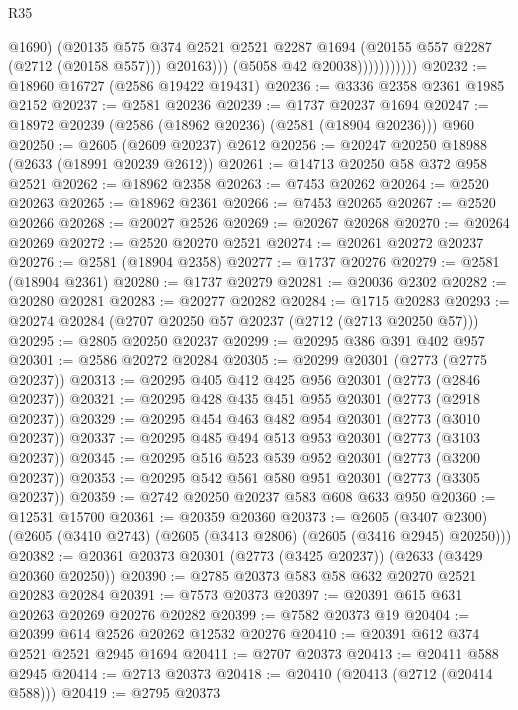 \begin{lexlean}{R35}
\begin{coremodule}
                              @1690)
                            (@20135
                              @575
                              @374
                              @2521
                              @2521
                              @2287
                              @1694
                              (@20155 @557 @2287 (@2712 (@20158 @557)))
                              @20163)))
                        (@5058 @42 @20038)))))))))))
@20232 := @18960 @16727 (@2586 @19422 @19431)
@20236 := @3336 @2358 @2361 @1985 @2152
@20237 := @2581 @20236
@20239 := @1737 @20237 @1694
@20247 := @18972 @20239 (@2586 (@18962 @20236) (@2581 (@18904 @20236))) @960
@20250 := @2605 (@2609 @20237) @2612
@20256 := @20247 @20250 @18988 (@2633 (@18991 @20239 @2612))
@20261 := @14713 @20250 @58 @372 @958 @2521
@20262 := @18962 @2358
@20263 := @7453 @20262
@20264 := @2520 @20263
@20265 := @18962 @2361
@20266 := @7453 @20265
@20267 := @2520 @20266
@20268 := @20027 @2526
@20269 := @20267 @20268
@20270 := @20264 @20269
@20272 := @2520 @20270 @2521
@20274 := @20261 @20272 @20237
@20276 := @2581 (@18904 @2358)
@20277 := @1737 @20276
@20279 := @2581 (@18904 @2361)
@20280 := @1737 @20279
@20281 := @20036 @2302
@20282 := @20280 @20281
@20283 := @20277 @20282
@20284 := @1715 @20283
@20293 := @20274 @20284 (@2707 @20250 @57 @20237 (@2712 (@2713 @20250 @57)))
@20295 := @2805 @20250 @20237
@20299 := @20295 @386 @391 @402 @957
@20301 := @2586 @20272 @20284
@20305 := @20299 @20301 (@2773 (@2775 @20237))
@20313 := @20295 @405 @412 @425 @956 @20301 (@2773 (@2846 @20237))
@20321 := @20295 @428 @435 @451 @955 @20301 (@2773 (@2918 @20237))
@20329 := @20295 @454 @463 @482 @954 @20301 (@2773 (@3010 @20237))
@20337 := @20295 @485 @494 @513 @953 @20301 (@2773 (@3103 @20237))
@20345 := @20295 @516 @523 @539 @952 @20301 (@2773 (@3200 @20237))
@20353 := @20295 @542 @561 @580 @951 @20301 (@2773 (@3305 @20237))
@20359 := @2742 @20250 @20237 @583 @608 @633 @950
@20360 := @12531 @15700
@20361 := @20359 @20360
@20373 := @2605
    (@3407 @2300)
    (@2605 (@3410 @2743) (@2605 (@3413 @2806) (@2605 (@3416 @2945) @20250)))
@20382 := @20361 @20373 @20301 (@2773 (@3425 @20237)) (@2633 (@3429 @20360 @20250))
@20390 := @2785 @20373 @583 @58 @632 @20270 @2521 @20283 @20284
@20391 := @7573 @20373
@20397 := @20391 @615 @631 @20263 @20269 @20276 @20282
@20399 := @7582 @20373 @19
@20404 := @20399 @614 @2526 @20262 @12532 @20276
@20410 := @20391 @612 @374 @2521 @2521 @2945 @1694
@20411 := @2707 @20373
@20413 := @20411 @588 @2945
@20414 := @2713 @20373
@20418 := @20410 (@20413 (@2712 (@20414 @588)))
@20419 := @2795 @20373

\end{coremodule}
\end{lexlean}
